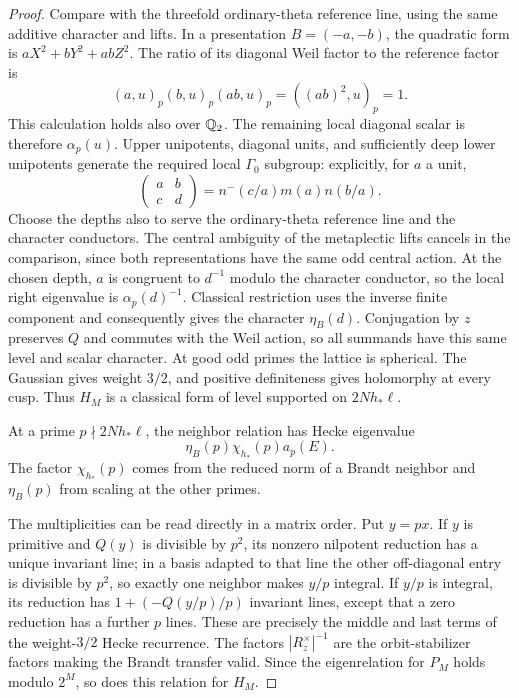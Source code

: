 \begin{proof}
Compare with the threefold ordinary-theta reference line, using the
same additive character and lifts.  In a presentation $B=(-a,-b)$,
the quadratic form is $aX^2+bY^2+abZ^2$.  The ratio of its diagonal
Weil factor to the reference factor is
\[
                   (a,u)_p(b,u)_p(ab,u)_p=((ab)^2,u)_p=1.
\]
This calculation holds also over $\mathbb Q_2$.  The remaining local
diagonal scalar is therefore $\alpha_p(u)$.  Upper unipotents,
diagonal units, and sufficiently deep lower unipotents generate the
required local $\Gamma_0$ subgroup: explicitly, for $a$ a unit,
\[
 \begin{pmatrix}a&b\\c&d\end{pmatrix}
 =n^-(c/a)m(a)n(b/a).
\]
Choose the depths also to serve the ordinary-theta reference line
and the character conductors.  The central ambiguity of the
metaplectic lifts cancels in the comparison, since both representations
have the same odd central action.  At the chosen depth, $a$ is congruent
to $d^{-1}$ modulo the character conductor, so the local right
eigenvalue is $\alpha_p(d)^{-1}$.  Classical
restriction uses the inverse finite component and consequently gives
the character $\eta_B(d)$.  Conjugation by $z$ preserves $Q$ and
commutes with the Weil action, so all summands have this same level
and scalar character.
At good odd primes the lattice is spherical. The Gaussian gives
weight $3/2$, and positive definiteness gives holomorphy at every cusp.
Thus $H_M$ is a classical form of level supported on $2Nh_*\ell$.

At a prime $p\nmid 2Nh_*\ell$, the neighbor relation has Hecke eigenvalue
\[
                         \eta_B(p)\chi_{h_*}(p)a_p(E).
\]
The factor
$\chi_{h_*}(p)$ comes from the reduced norm of a Brandt neighbor and
$\eta_B(p)$ from scaling at the other primes.

The multiplicities can be read directly in a matrix order.  Put $y=px$.
If $y$ is primitive
and $Q(y)$ is divisible by $p^2$, its nonzero nilpotent reduction has a
unique invariant line; in a basis adapted to that line the other
off-diagonal entry is divisible by $p^2$, so exactly one neighbor makes
$y/p$ integral.  If $y/p$ is integral, its reduction has
$1+(-Q(y/p)/p)$ invariant lines, except that a zero reduction has a
further $p$ lines.  These are precisely the middle and last terms of
the weight-$3/2$ Hecke recurrence.  The factors $|R_z^\times|^{-1}$
are the orbit-stabilizer factors making the Brandt transfer valid.
Since the eigenrelation for $P_M$ holds modulo $2^M$, so does this
relation for $H_M$.


\end{proof}
